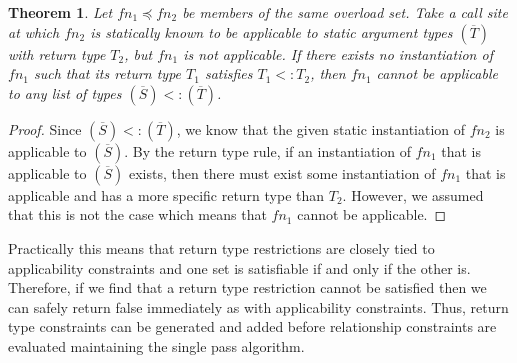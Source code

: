 \documentclass[preprint]{sigplanconf}
\newtheorem{theorem}{Theorem}[section]
\begin{document}
\begin{theorem}
Let $fn_1 \preceq fn_2$ be members of the same overload set.  Take a call site at which 
$fn_2$ is statically known to be applicable to static argument types $(\overline{T})$ with return type $T_2$, but 
$fn_1$ is not applicable.  If there exists no instantiation of $fn_1$ such that its return type $T_1$ satisfies 
$T_1 <: T_2$, then $fn_1$ cannot be applicable to any list of types $(\overline{S}) <: (\overline{T})$.
\end{theorem}

\begin{proof}
Since $(\overline{S}) <: (\overline{T})$, we know that the given static instantiation of $fn_2$ is applicable
to $(\overline{S})$.  By the return type rule, if an instantiation of $fn_1$ that is applicable to $(\overline{S})$
exists, then there must exist some instantiation of $fn_1$ that is applicable and has a more specific
return type than $T_2$.  However, we assumed that this is not the case which means that $fn_1$ cannot
be applicable.
\end{proof}

Practically this means that return type restrictions are closely tied to applicability constraints and one set
is satisfiable if and only if the other is.  Therefore, if we find that a return type restriction cannot be satisfied
then we can safely return false immediately as with applicability constraints.  Thus, return type constraints
can be generated and added before relationship constraints are evaluated maintaining the single pass
algorithm.
\end{document}
